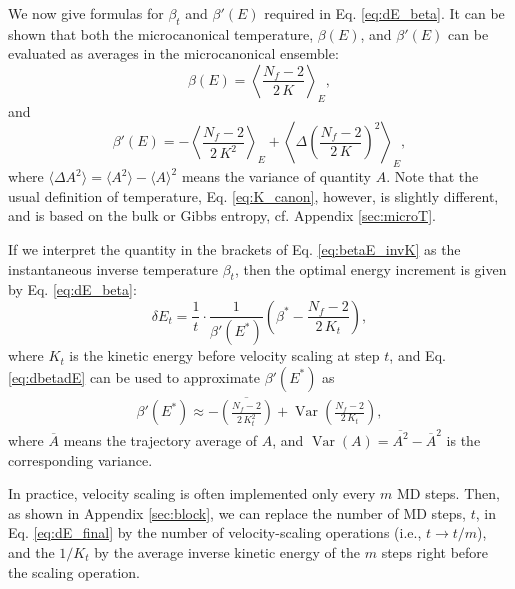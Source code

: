 \documentclass[reprint]{revtex4-1}
\begin{document}
We now give formulas for $\beta_t$
and $\beta'(E)$ required in Eq. \eqref{eq:dE_beta}.
%
It can be shown that both the microcanonical temperature, $\beta(E)$,
and $\beta'(E)$ can be evaluated as
averages in the microcanonical ensemble\cite{rugh1997}:
%
\begin{equation}
  \beta(E)
  =
  \left\langle
    \frac{ N_f - 2 }
         { 2 \, K }
  \right\rangle_E
  ,
  \label{eq:betaE_invK}
\end{equation}
%
and
%
\begin{equation}
  \beta'(E)
  =
  - \left\langle
      \frac{ N_f - 2 }
           { 2 \, K^2 }
    \right\rangle_E
  + \left\langle
      \Delta\left(
        \frac{ N_f - 2 }
             { 2 \, K }
      \right)^2
    \right\rangle_E
  ,
  \label{eq:dbetadE}
\end{equation}
%
where
$\langle \Delta A^2 \rangle = \langle A^2 \rangle - \langle A \rangle^2$
means the variance of quantity $A$.
%
Note that the usual definition of temperature, Eq. \eqref{eq:K_canon},
however, is slightly different,
and is based on the bulk or Gibbs entropy,
cf. Appendix \ref{sec:microT}.



If we interpret the quantity in the brackets of
Eq. \eqref{eq:betaE_invK} as
the instantaneous inverse temperature
$\beta_t$,
then the optimal energy increment is given by
Eq. \eqref{eq:dE_beta}:
%
\begin{equation}
\delta E_t
=
\frac{ 1 } { t } \cdot
\frac{ 1 } { \beta'(E^*) }
\left(
 \beta^* -
 \frac{ N_f - 2  }
      { 2 \, K_t }
\right)
,
\label{eq:dE_final}
\end{equation}
%
where
$K_t$ is the kinetic energy before velocity scaling at step $t$,
and
Eq. \eqref{eq:dbetadE} can be used to approximate
$\beta'(E^*)$ as
%
\begin{align}
  \beta'(E^*)
  \approx
  - \overline{
    \left(
      \frac{ N_f - 2 }
           { 2 \, K_t^2 }
    \right)
    }
    +
    \operatorname{Var}
    \left(
        \frac{ N_f - 2 }
             { 2 \, K_t }
    \right)
  ,
  \label{eq:dbeta}
\end{align}
%
where
$\overline A$ means the trajectory average of $A$,
and
$\operatorname{Var}(A) = \overline{ A^2 } - {\overline A}^2$
is the corresponding variance.

In practice, velocity scaling is often implemented
only every $m$ MD steps.
%
Then,
as shown in Appendix \ref{sec:block},
we can replace the number of MD steps, $t$, in Eq. \eqref{eq:dE_final} by
the number of velocity-scaling operations
(i.e., $t \to t/m$), and
the $1/K_t$ by the average inverse kinetic energy
of the $m$ steps right
before the scaling operation.
\end{document}
